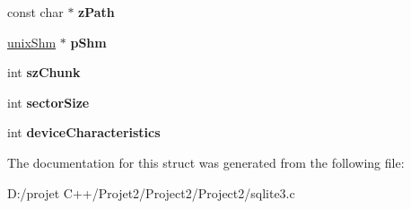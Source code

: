 \begin{DoxyCompactItemize}
\item 
\mbox{\label{structunix_file_afc5eff0948d553308cf90a79d4a06f17}} 
const char $\ast$ {\bfseries z\+Path}
\item 
\mbox{\label{structunix_file_a53c653bd73cdc6f518ecffe95062e91a}} 
\mbox{\hyperlink{structunix_shm}{unix\+Shm}} $\ast$ {\bfseries p\+Shm}
\item 
\mbox{\label{structunix_file_a5f6307d3446ce1b149df756c00c3bd2e}} 
int {\bfseries sz\+Chunk}
\item 
\mbox{\label{structunix_file_af7782ba6289e49df63dcfa3c476fb702}} 
int {\bfseries sector\+Size}
\item 
\mbox{\label{structunix_file_a9b42bed1e21265286a1aeecc5b3a1df1}} 
int {\bfseries device\+Characteristics}
\end{DoxyCompactItemize}


The documentation for this struct was generated from the following file\+:\begin{DoxyCompactItemize}
\item 
D\+:/projet C++/\+Projet2/\+Project2/\+Project2/sqlite3.\+c\end{DoxyCompactItemize}
